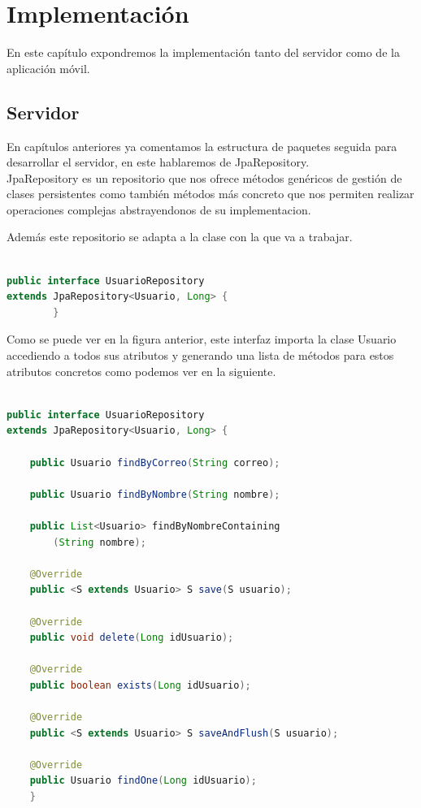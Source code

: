 
\section{Implementación}
En este capítulo expondremos la implementación tanto del servidor como de la aplicación móvil.


\subsection{Servidor}
En capítulos anteriores ya comentamos la estructura de paquetes seguida para desarrollar el servidor, en este hablaremos de JpaRepository.\\

JpaRepository es un repositorio que nos ofrece métodos genéricos de gestión de clases persistentes como también métodos más concreto que nos permiten realizar operaciones complejas abstrayendonos de su implementacion.

Además este repositorio se adapta a la clase con la que va a trabajar.
\begin{lstlisting}[language=java,caption={Adaptación a la clase Usuario },label=DescriptiveLabel]
    
public interface UsuarioRepository 
extends JpaRepository<Usuario, Long> {
		}

\end{lstlisting} 
	




	
Como se puede ver en la figura anterior, este interfaz importa la clase Usuario accediendo a todos sus atributos y generando una lista de métodos para estos atributos concretos como podemos ver en la siguiente.\\

\begin{lstlisting}[language=java,caption={Interfaz  de UsuarioRepository},label=DescriptiveLabel]
    
public interface UsuarioRepository 
extends JpaRepository<Usuario, Long> {

	public Usuario findByCorreo(String correo);

	public Usuario findByNombre(String nombre);

	public List<Usuario> findByNombreContaining
		(String nombre);

	@Override
	public <S extends Usuario> S save(S usuario);

	@Override
	public void delete(Long idUsuario);

	@Override
	public boolean exists(Long idUsuario);

	@Override
	public <S extends Usuario> S saveAndFlush(S usuario);

	@Override
	public Usuario findOne(Long idUsuario);
	}


\end{lstlisting} 

